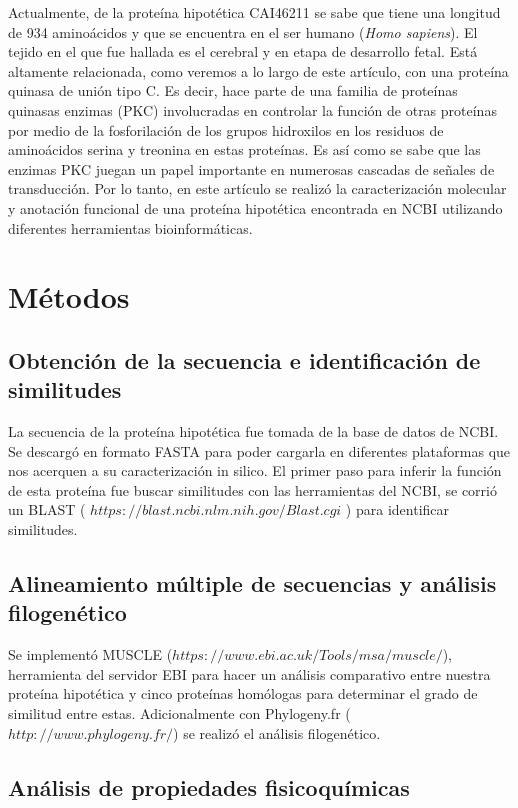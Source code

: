 \documentclass[journal,transmag]{IEEEtran}
\begin{document}
Actualmente, de la proteína hipotética CAI46211 se sabe que tiene una longitud de 934 aminoácidos y que se encuentra en el ser humano (\textit{Homo sapiens}). El tejido en el que fue hallada es el cerebral y en etapa de desarrollo fetal. Está altamente relacionada, como veremos a lo largo de este artículo, con una proteína quinasa de unión tipo C. Es decir, hace parte de una familia de proteínas quinasas enzimas (PKC) involucradas en controlar la función de otras proteínas por medio de la fosforilación de los grupos hidroxilos en los residuos de aminoácidos serina y treonina en estas proteínas. Es así como se sabe que las enzimas PKC juegan un papel importante en numerosas cascadas de señales de transducción.  Por lo tanto, en este artículo se realizó la caracterización molecular y anotación funcional de una proteína hipotética encontrada en NCBI utilizando diferentes herramientas bioinformáticas.

\section{Métodos}
 \subsection{\textbf{ Obtención de la secuencia e identificación de similitudes}}

 La secuencia de la proteína hipotética fue tomada de la base de datos de NCBI. Se descargó en formato FASTA para poder cargarla en diferentes plataformas que nos acerquen a su caracterización in silico. El primer paso para inferir la función de esta proteína fue buscar similitudes con las herramientas del NCBI, se corrió un BLAST ( $https://blast.ncbi.nlm.nih.gov/Blast.cgi$ ) para identificar similitudes. 
 
 \subsection{\textbf{ Alineamiento múltiple de secuencias y análisis filogenético}}

Se implementó MUSCLE ($https://www.ebi.ac.uk/Tools/msa/muscle/ $), herramienta del servidor EBI para hacer un análisis comparativo entre nuestra proteína hipotética y cinco proteínas homólogas para determinar el grado de similitud entre estas. Adicionalmente con Phylogeny.fr ($http://www.phylogeny.fr/ $) se realizó el análisis filogenético. 

\subsection{\textbf{ Análisis de propiedades fisicoquímicas}}
\end{document}
